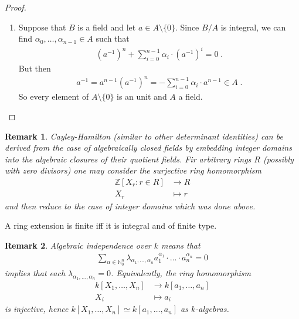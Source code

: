 \documentclass[DIV=14,parskip=full,pointednumbers]{scrartcl}
\newenvironment{rmnumerate}{\begin{enumerate}[label={\upshape(\roman*)}]}{\end{enumerate}}
\theoremstyle{cthm}
\theoremstyle{cvarthm}
\theoremstyle{cdef}
\newtheorem{rem}{Remark}[subsection]
\newcommand{\IN}{\mathbb{N}}
\newcommand{\IZ}{\mathbb{Z}}
\newcommand{\longto}{\longrightarrow}
\newcommand{\ldotspam}{,\ldots,}
\begin{document}
\begin{proof}
\begin{rmnumerate}
  \item Suppose that $B$ is a field and let $a\in A \setminus\{0\}$. Since $B/A$ is integral, we can find $\alpha_0\ldotspam \alpha_{n-1}\in A$ such that 
\begin{align*}
 \left(a^{-1}\right)^n+\sum_{i=0}^{n-1}\alpha_i\cdot\left(a^{-1}\right)^i = 0\;.
\end{align*}
But then 
\begin{align*}
 a^{-1} = a^{n-1}\left(a^{-1}\right)^n = -\sum_{i=0}^{n-1} \alpha_i\cdot a^{n-1} \in A\;.
 \end{align*}
So every element of $A\setminus\{0\}$ is an unit and $A$ a field.
 \end{rmnumerate}
 

\end{proof}
\begin{rem}
 Cayley-Hamilton (similar to other determinant identities) can be derived from the case of algebraically closed fields by embedding integer domains into the algebraic closures of their quotient fields. Fir arbitrary rings $R$ (possibly with zero divisors) one may consider the surjective ring homomorphism
 \begin{align*}
  \IZ[X_r: r\in R] &\longto R\\
  X_r &\longmapsto r
 \end{align*}
 and then reduce to the case of integer domains which was done above.

\end{rem}

\begin{cor}
 A ring extension is finite iff it is integral and of finite type.
\end{cor}
\begin{rem}
 Algebraic independence over $k$ means that
 \begin{align*}
  \sum_{\alpha\in \IN_0^n} \lambda_{\alpha_1\ldotspam \alpha_n} a_1^{\alpha_1}\cdot\ldots\cdot a_n^{\alpha_n}=0
 \end{align*}
implies that each $\lambda_{\alpha_1\ldotspam \alpha_n}=0$. Equivalently, the ring homomorphism 
\begin{align*}
 k[X_1,\ldots, X_n]&\longto k[a_1,\ldots, a_n]\\
 X_i&\longmapsto a_i
\end{align*}
is injective, hence $k[X_1,\ldots, X_n]\simeq k[a_1,\ldots, a_n]$ as $k$-algebras.
\end{rem}
\end{document}

